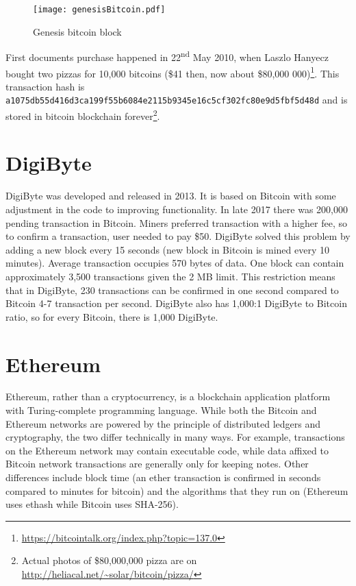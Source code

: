 \begin{figure}[h]
    \centering
    \texttt{[image: genesisBitcoin.pdf]}
    \caption{Genesis bitcoin block}
    \label{genesisBitcoin}
\end{figure}

First documents purchase happened in 22\textsuperscript{nd} May 2010, when Laszlo Hanyecz bought two pizzas for 10,000 bitcoins (\$41 then, now about \$80,000 000)\footnote{\url{https://bitcointalk.org/index.php?topic=137.0}}. This transaction hash is \texttt{a1075db55d416d3ca199f55b6084e\-2115b9345e16c5cf302fc80e9d5fbf5d48d} and is stored in bitcoin blockchain forever\footnote{Actual photos of \$80,000,000 pizza are on \url{http://heliacal.net/~solar/bitcoin/pizza/}}.


\section{DigiByte}
DigiByte was developed and released in 2013. It is based on Bitcoin with some adjustment in the code to improving functionality. In late 2017 there was 200,000 pending transaction in Bitcoin. Miners preferred transaction with a higher fee, so to confirm a transaction, user needed to pay \$50. DigiByte solved this problem by adding a new block every 15 seconds (new block in Bitcoin is mined every 10 minutes). Average transaction occupies 570 bytes of data. One block can contain approximately 3,500 transactions given the 2 MB limit. This restriction means that in DigiByte, 230 transactions can be confirmed in one second compared to Bitcoin 4-7 transaction per second. DigiByte also has 1,000:1 DigiByte to Bitcoin ratio, so for every Bitcoin, there is 1,000 DigiByte. \cite{digibyteBook}


\section{Ethereum}
Ethereum, rather than a cryptocurrency, is a blockchain application platform with Turing-complete programming language. While both the Bitcoin and Ethereum networks are powered by the principle of distributed ledgers and cryptography, the two differ technically in many ways. For example, transactions on the Ethereum network may contain executable code, while data affixed to Bitcoin network transactions are generally only for keeping notes. Other differences include block time (an ether transaction is confirmed in seconds compared to minutes for bitcoin) and the algorithms that they run on (Ethereum uses ethash while Bitcoin uses SHA-256). \cite{wood2014ethereum, buterin2014next}



